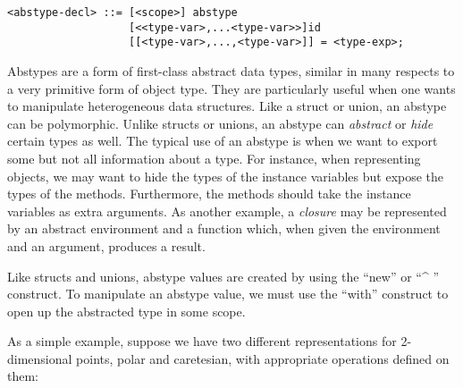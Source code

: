 \documentclass[titlepage,10pt]{article}
\begin{document}
\begin{verbatim}
<abstype-decl> ::= [<scope>] abstype 
                   [<<type-var>,...<type-var>>]id
                   [[<type-var>,...,<type-var>]] = <type-exp>;
\end{verbatim}

Abstypes are a form of first-class abstract data types, similar in many
respects to a very primitive form of object type. They are particularly
useful when one wants to manipulate heterogeneous data structures. Like
a struct or union, an abstype can be polymorphic.  Unlike structs or
unions, an abstype can \textit{abstract} or \textit{hide} certain types
as well.  The typical use of an abstype is when we want to export some
but not all information about a type.  For instance, when representing
objects, we may want to hide the types of the instance variables but
expose the types of the methods.  Furthermore, the methods should take
the instance variables as extra arguments.  As another example, a
\textit{closure} may be represented by an abstract environment and a
function which, when given the environment and an argument, produces a
result.

Like structs and unions, abstype values are created by using the ``new''
or ``\^{} '' construct.  To manipulate an abstype value, we must use the
``with'' construct to open up the abstracted type in some scope.

As a simple example, suppose we have two different representations for
2-dimensional points, polar and caretesian, with appropriate operations
defined on them:

\end{document}
